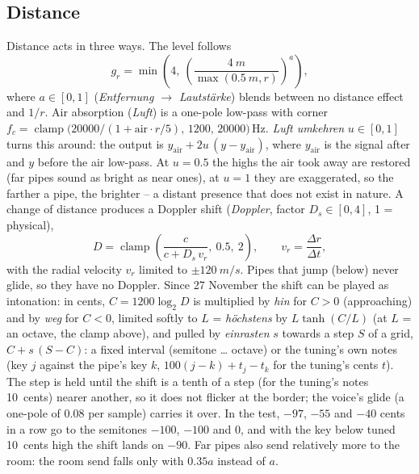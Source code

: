 \documentclass[11pt,a4paper,parskip=half,DIV=11,toc=bibliography]{scrartcl}
\newcommand{\ui}[1]{\emph{#1}}                 %
\begin{document}
\subsection{Distance}
\label{sec:distance}
Distance acts in three ways. The level follows
\begin{equation}
  g_r = \min\!\left(4,\ \left(\frac{\SI{4}{m}}{\max(\SI{0.5}{m},r)}\right)^{\!a}\right),
\end{equation}
where $a\in[0,1]$ (\ui{Entfernung $\rightarrow$ Lautstärke}) blends between no distance effect and $1/r$.
Air absorption (\ui{Luft}) is a one-pole low-pass with corner
$f_c = \operatorname{clamp}\bigl(20000/(1+\text{air}\cdot r/5),\,1200,\,20000\bigr)$\,Hz.
\ui{Luft umkehren} $u\in[0,1]$ turns this around: the output is $y_\text{air}+2u\,(y-y_\text{air})$, where $y_\text{air}$ is the
signal after and $y$ before the air low-pass. At $u=0.5$ the highs the air took away are restored (far pipes
sound as bright as near ones), at $u=1$ they are exaggerated, so the farther a pipe, the brighter -- a distant presence
that does not exist in nature. A change of distance
produces a Doppler shift (\ui{Doppler}, factor $D_s\in[0,4]$, 1 = physical),
\begin{equation}
  D = \operatorname{clamp}\!\left(\frac{c}{c + D_s\,v_r},\ 0.5,\ 2\right),\qquad
  v_r = \frac{\Delta r}{\Delta t},
\end{equation}
with the radial velocity $v_r$ limited to $\pm\SI{120}{m/s}$. Pipes that jump (below) never glide, so
they have no Doppler. Since 27 November the shift can be played as intonation: in cents, $C = 1200\log_2 D$ is
multiplied by \ui{hin} for $C > 0$ (approaching) and by \ui{weg} for $C < 0$, limited softly to $L$ = \ui{höchstens}
by $L\tanh(C/L)$ (at $L$ = an octave, the clamp above), and pulled by \ui{einrasten} $s$ towards a step $S$ of a grid,
$C + s\,(S - C)$: a fixed interval (semitone \ldots{} octave) or the tuning's own notes (key $j$ against the pipe's key $k$,
$100(j-k) + t_j - t_k$ for the tuning's cents $t$). The step is held until the shift is a tenth of a step (for the tuning's
notes \SI{10}{cents}) nearer another, so it does not flicker at the border; the voice's glide (a one-pole of $0.08$ per
sample) carries it over. In the test, $-97$, $-55$ and $-40$ cents in a row go to the semitones $-100$, $-100$ and $0$, and
with the key below tuned \SI{10}{cents} high the shift lands on $-90$. Far pipes also send relatively more to the room: the room send falls only with
$0.35a$ instead of $a$.
\end{document}
